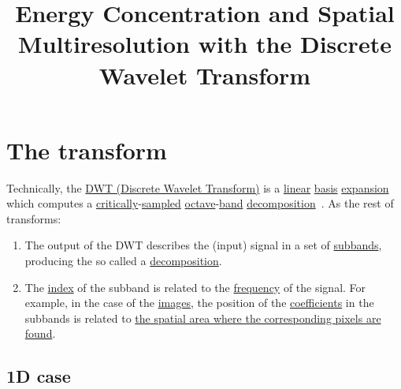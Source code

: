 \title{Energy Concentration and Spatial Multiresolution with the Discrete Wavelet Transform}

\maketitle

\tableofcontents

\section{The transform}

Technically, the
\href{https://en.wikipedia.org/wiki/Discrete_wavelet_transform}{DWT
  (Discrete Wavelet Transform)} is a
\href{https://en.wikipedia.org/wiki/Linearity}{linear}
\href{https://en.wikipedia.org/wiki/Change_of_basis}{basis}
\href{https://www.youtube.com/watch?v=P2LTAUO1TdA}{expansion} which
computes a
\href{https://www.dsprelated.com/freebooks/sasp/Critically_Sampled_Perfect_Reconstruction.html}{critically}-\href{https://en.wikipedia.org/wiki/Nyquist-Shannon_sampling_theorem}{sampled}
\href{https://en.wikipedia.org/wiki/Octave_(electronics)}{octave}-\href{https://en.wikipedia.org/wiki/Frequency_band}{band}
\href{https://www.sciencedirect.com/topics/engineering/wavelet-decomposition}{decomposition}~\cite{vetterli2014foundations,kovacevic2013fourier}. As the rest of transforms:
\begin{enumerate}
\item The output of the DWT describes the (input) signal in a set of
  \href{https://en.wikipedia.org/wiki/Sub-band_coding}{subbands},
  producing the so called a
  \href{https://en.wikipedia.org/wiki/Discrete_wavelet_transform}{decomposition}.
\item The
  \href{https://en.wikipedia.org/wiki/Array_data_structure#Element_identifier_and_addressing_formulas}{index}
  of the subband is related to the
  \href{https://en.wikipedia.org/wiki/Frequency}{frequency} of the
  signal. For example, in the case of the
  \href{https://en.wikipedia.org/wiki/Digital_image}{images}, the
  position of the
  \href{https://en.wikipedia.org/wiki/Coefficient}{coefficients} in
  the subbands is related to
  \href{https://en.wikipedia.org/wiki/Discrete_wavelet_transform#/media/File:Jpeg2000_2-level_wavelet_transform-lichtenstein.png}{the
    spatial area where the corresponding pixels are found}.
\end{enumerate}

\subsection{1D case}

